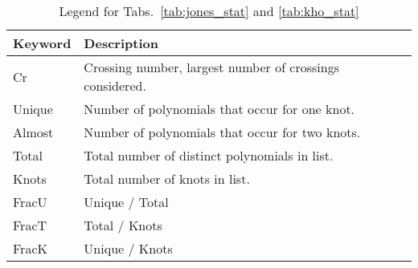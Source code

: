     \begin{table}
        \centering
        \begin{tabular}{| l | l |}
            \hline
            Keyword & Description\\
            \hline
            Cr     & Crossing number, largest number of crossings considered.\\
            Unique & Number of polynomials that occur for one knot.\\
            Almost & Number of polynomials that occur for two knots.\\
            Total  & Total number of distinct polynomials in list.\\
            Knots  & Total number of knots in list.\\
            FracU  & Unique / Total\\
            FracT  & Total / Knots\\
            FracK  & Unique / Knots\\
            \hline
        \end{tabular}
        \caption{Legend for Tabs.~\ref{tab:jones_stat} and \ref{tab:kho_stat}}
        \label{tab:key}
    \end{table}

